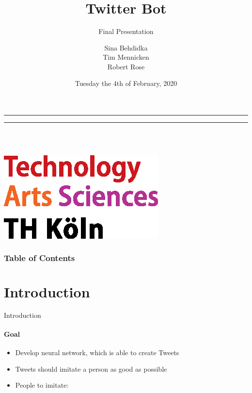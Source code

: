 \documentclass{beamer}
\title{Twitter Bot}
\subtitle{Final Presentation}
\author[Sina Behdidka, Tim Mennicken, Robert Rose]{Sina Behdidka\\ Tim Mennicken\\ Robert Rose }
\institute[TH Köln]{University of Applied Sciences Cologne}
\date[04.02.2020] %
{Tuesday the 4th of February, 2020}
\begin{document}
\bgroup
\makeatletter
{}
{
	\leavevmode
    \begin{beamercolorbox}[wd=0.125\paperwidth,dp=1pt]{}
    \end{beamercolorbox}%
    \begin{beamercolorbox}[wd=0.875\paperwidth,dp=0ex]{}
    \hrule
    \vspace{0.1mm}
    \hrule
    \vspace{1mm}
    \parbox[b]{0.3\paperwidth}{\inserttitle\\[1.5mm] \insertshortauthor\\ \insertshortdate}
    \hfill
    \includegraphics[width=0.12\paperwidth]{sources/logo_TH-Koeln_CMYK_22pt}
    \hspace{2mm}
    \vspace{1mm}
    \end{beamercolorbox}%
}
\makeatother
\begin{frame}
\titlepage
\end{frame}
\egroup

\setcounter{framenumber}{0}

\begin{frame}
\frametitle{Table of Contents}
\tableofcontents
\end{frame} 
 
\section{Introduction}

\begin{frame}{Introduction}
\framesubtitle{Goal}
\begin{itemize}
\item Develop neural network, which is able to create Tweets
\item Tweets should imitate a person as good as possible
\item People to imitate:
\end{itemize}
\pause
\vfill
{}
\end{frame}
\end{document}
